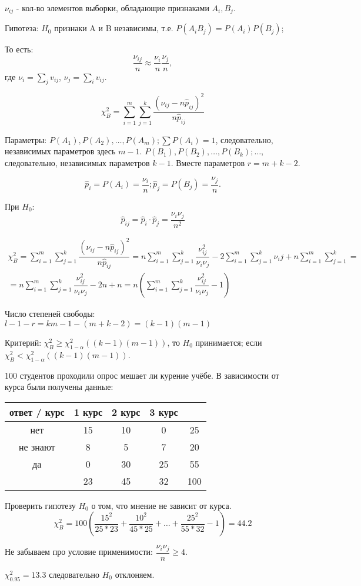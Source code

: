 $\nu_{ij}$ - кол-во элементов выборки, обладающие признаками $A_i, B_j$.

Гипотеза: $H_0$ признаки A и B независимы, т.е.
$P(A_i B_j) = P(A_i) P(B_j)$;

То есть:
\[
  \dfrac{\nu_{ij}}{n} \approx \dfrac{\nu_i}{n} \dfrac{\nu_j}{n},
\]
где $\nu_i = \sum_j v_{ij}$, $\nu_j = \sum_i v_{ij}$.

\[
  \chi^2_B = \sum_{i=1}^m \sum_{j=1}^k \dfrac{(\nu_{ij} - n \hat p_{ij})^2}{n \hat p_{ij}}
\]

Параметры: $P(A_1), P(A_2), \dots, P(A_m); \sum P(A_i) = 1$, следовательно, независимых параметров здесь $m-1$. $P(B_1), P(B_2), \dots, P(B_k); \dots$, следовательно, независимых параметров $k-1$. Вместе параметров $r = m+k-2$.

\[
  \hat p_{i} = P(A_i) = \dfrac{\nu_i}{n}; \hat p_j = P(B_j) = \dfrac{\nu_j}{n}.
\]

При $H_0$:
\[
  \hat p_{ij} = \hat p_i \cdot \hat p_j = \dfrac{\nu_i \nu_j}{n^2}
\]

\begin{multline*}
  \chi^2_B
  = \sum_{i=1}^m \sum_{j=1}^k \dfrac{(\nu_{ij} - n \hat p_{ij})^2}{n \hat p_{ij}}
  = n \sum_{i=1}^m \sum_{j=1}^k \dfrac{\nu^2_{ij}}{\nu_i \nu_j} - 2 \sum_{i=1}^m \sum_{j=1}^k \nu_ij + n \sum_{i=1}^m \sum_{j=1}^k = \\
  = n \sum_{i=1}^m \sum_{j=1}^k \dfrac{\nu^2_{ij}}{\nu_i \nu_j} - 2n + n
  = n \left(\sum_{i=1}^m \sum_{j=1}^k \dfrac{\nu^2_{ij}}{\nu_i \nu_j} - 1\right)
\end{multline*}

Число степеней свободы:
$l-1-r = k m - 1 - (m+k-2) = (k-1)(m-1)$

Критерий: $\chi^2_B \geqslant \chi^2_{1-\alpha} ( (k-1)(m-1) )$, то $H_0$ принимается;
если $\chi^2_B < \chi^2_{1-\alpha} ( (k-1)(m-1) )$.

\begin{ex}
  100 студентов проходили опрос мешает ли курение учёбе.
  В зависимости от курса были получены данные:

  \begin{center}
    \begin{tabular}{|c|c|c|c|c|}
      \hline
      ответ / курс & 1 курс & 2 курс & 3 курс & \\
      \hline
      нет & 15 & 10 & 0 & 25\\
      \hline
      не знают & 8 & 5 & 7 & 20 \\
      \hline
      да & 0 & 30 & 25 & 55 \\
      \hline
         & 23 & 45 & 32 & 100 \\
      \hline
    \end{tabular}
  \end{center}

  Проверить гипотезу $H_0$ о том, что мнение не зависит от курса.
  \[
  \chi^2_B = 100 (\dfrac{15^2}{25*23} + \dfrac{10^2}{45*25} + \dots + \dfrac{25^2}{55*32} - 1) = 44.2
  \]

  Не забываем про условие применимости: $\dfrac{\nu_i \nu_j}{n} \geqslant 4$.

  $\chi^2_{0.95} = 13.3$ следовательно $H_0$ отклоняем.
\end{ex}

